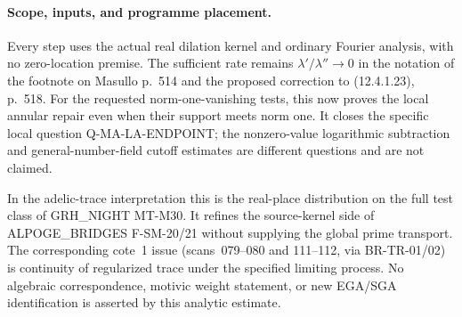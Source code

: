 \paragraph{Scope, inputs, and programme placement.}
Every step uses the actual real dilation kernel and ordinary
Fourier analysis, with no zero-location premise. The sufficient
rate remains $\lambda'/\lambda''\to0$ in the notation of the
footnote on Masullo p.~514 and the proposed correction to
(12.4.1.23), p.~518. For the requested norm-one-vanishing
tests, this now proves the local annular repair even when their
support meets norm one. It closes the specific local question
Q-MA-LA-ENDPOINT; the nonzero-value logarithmic subtraction
and general-number-field cutoff estimates are different
questions and are not claimed.

In the adelic-trace interpretation this is the real-place
distribution on the full test class of GRH\_NIGHT MT-M30.
It refines the source-kernel side of ALPOGE\_BRIDGES
F-SM-20/21 without supplying the global prime transport.
The corresponding cote~1 issue (scans~079--080 and 111--112,
via BR-TR-01/02) is continuity of regularized trace under the
specified limiting process. No algebraic correspondence,
motivic weight statement, or new EGA/SGA identification is
asserted by this analytic estimate.
